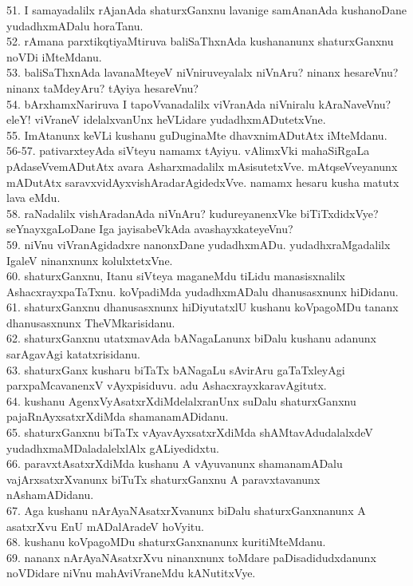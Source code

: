\documentclass{article}
\begin{document}
51. I samayadalilx rAjanAda shaturxGanxnu lavanige samAnanAda kushanoDane yudadhxmADalu horaTanu.\\
52. rAmana parxtikqtiyaMtiruva baliSaThxnAda kushananunx shaturxGanxnu noVDi iMteMdanu.\\
53. baliSaThxnAda lavanaMteyeV niVniruveyalalx niVnAru? ninanx hesareVnu? ninanx taMdeyAru? tAyiya hesareVnu?\\
54. bArxhamxNariruva I tapoVvanadalilx viVranAda niVniralu kAraNaveVnu? eleY! viVraneV idelalxvanUnx heVLidare yudadhxmADutetxVne.\\
55. ImAtanunx keVLi kushanu guDuginaMte dhavxnimADutAtx iMteMdanu.\\
56-57. pativarxteyAda siVteyu namamx tAyiyu. vAlimxVki mahaSiRgaLa pAdaseVvemADutAtx avara Asharxmadalilx mAsisutetxVve. mAtqseVveyanunx mADutAtx saravxvidAyxvishAradarAgidedxVve. namamx hesaru kusha matutx lava eMdu.\\
58. raNadalilx vishAradanAda niVnAru? kudureyanenxVke biTiTxdidxVye? seYnayxgaLoDane Iga jayisabeVkAda avashayxkateyeVnu?\\
59. niVnu viVranAgidadxre nanonxDane yudadhxmADu. yudadhxraMgadalilx IgaleV ninanxnunx kolulxtetxVne.\\
60. shaturxGanxnu, Itanu siVteya maganeMdu tiLidu manasisxnalilx AshacxrayxpaTaTxnu. koVpadiMda yudadhxmADalu dhanusasxnunx hiDidanu.\\
61. shaturxGanxnu dhanusasxnunx hiDiyutatxlU kushanu koVpagoMDu tananx dhanusasxnunx TheVMkarisidanu.\\
62. shaturxGanxnu utatxmavAda bANagaLanunx biDalu kushanu adanunx sarAgavAgi katatxrisidanu.\\
63. shaturxGanx kusharu biTaTx bANagaLu sAvirAru gaTaTxleyAgi parxpaMcavanenxV vAyxpisiduvu. adu AshacxrayxkaravAgitutx.\\
64. kushanu AgenxVyAsatxrXdiMdelalxranUnx suDalu shaturxGanxnu pajaRnAyxsatxrXdiMda shamanamADidanu.\\
65. shaturxGanxnu biTaTx vAyavAyxsatxrXdiMda shAMtavAdudalalxdeV yudadhxmaMDaladalelxlAlx gALiyedidxtu.\\
66. paravxtAsatxrXdiMda kushanu A vAyuvanunx shamanamADalu vajArxsatxrXvanunx biTuTx shaturxGanxnu A paravxtavanunx nAshamADidanu.\\
67. Aga kushanu nArAyaNAsatxrXvanunx biDalu shaturxGanxnanunx A asatxrXvu EnU mADalAradeV hoVyitu.\\
68. kushanu koVpagoMDu shaturxGanxnanunx kuritiMteMdanu.\\
69. nananx nArAyaNAsatxrXvu ninanxnunx toMdare paDisadidudxdanunx noVDidare niVnu mahAviVraneMdu kANutitxVye.\\
\end{document}
